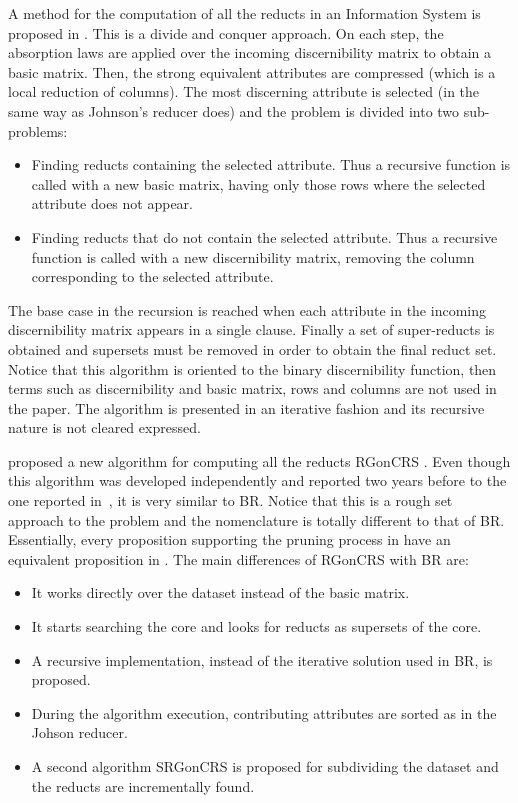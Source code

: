 \documentclass[authoryear,11pt]{elsarticle}
\makeatletter
\newcommand{\setword}[2]{%
  \phantomsection
  #1\def\@currentlabel{\unexpanded{#1}}\label{#2}%
}
\makeatother
\begin{document}
  A method for the computation of all the reducts in an Information System is proposed in
  \citep{Starzyk99,Starzyk00}.
  This is a divide and conquer approach. On each step, the absorption laws are applied over the incoming
  discernibility matrix to obtain a basic matrix. Then, the strong equivalent attributes are compressed
  (which is a local reduction of columns). The most discerning attribute is selected (in the same way as 
  Johnson's reducer does) and the problem is divided into two sub-problems: 
  \begin{itemize}
  \item Finding reducts containing the selected attribute. Thus a recursive function is called with a new basic 
  matrix, having only those rows where the selected attribute does not appear.
  \item Finding reducts that do not contain the selected attribute. Thus a recursive function is called with a new 
  discernibility matrix, removing the column corresponding to the selected attribute.
  \end{itemize}
  The base case in the recursion is reached when each attribute in the incoming discernibility matrix appears 
  in a single clause. Finally a set of super-reducts is obtained and supersets must be removed in order to obtain 
  the final reduct set.
  Notice that this algorithm is oriented to the binary discernibility function, then 
  terms such as discernibility and basic matrix, rows and columns are not used in the paper. The
  algorithm is presented in an iterative fashion and its recursive nature is not cleared expressed.
  
  \cite{WangP07} proposed a new algorithm for computing all the reducts \setword{RGonCRS}{RGonCRS}. 
  Even though this algorithm 
  was developed independently and reported two years before to the one reported in~\citep{Lias09}, it is very 
  similar to BR. Notice that this is a rough set approach to the problem and the nomenclature is totally 
  different to that of BR. Essentially, every proposition supporting the pruning process in \citep{WangP07} 
  have an equivalent proposition in \citep{Lias09}. The main differences of RGonCRS with BR are:
  \begin{itemize}
  \item It works directly over the dataset instead of the basic matrix.
  \item It starts searching the core and looks for reducts as supersets of the core.
  \item A recursive implementation, instead of the iterative solution used in BR, is proposed.
  \item During the algorithm execution, contributing attributes are sorted as in the Johson reducer.
  \item A second algorithm \setword{SRGonCRS}{SRGonCRS} is proposed for subdividing the dataset and the reducts are
  		incrementally found.
  \end{itemize}
  
\end{document}
